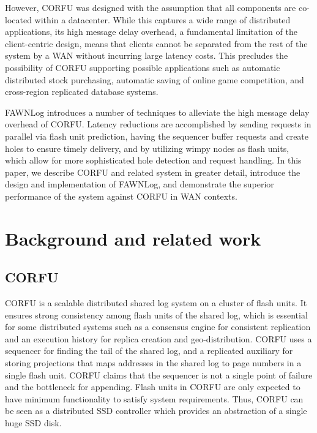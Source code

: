 \documentclass[letterpaper,twocolumn,10pt]{article}
\begin{document}
However, CORFU was designed with the assumption that all components are co-located within a datacenter. While this captures a wide range of distributed applications, its high message delay overhead, a fundamental limitation of the client-centric design, means that clients cannot be separated from the rest of the system by a WAN without incurring large latency costs. This precludes the possibility of CORFU supporting possible applications such as automatic distributed stock purchasing, automatic saving of online game competition, and cross-region replicated database systems.

FAWNLog introduces a number of techniques to alleviate the high message delay overhead of CORFU. Latency reductions are accomplished by sending requests in parallel via flash unit prediction, having the sequencer buffer requests and create holes to ensure timely delivery, and by utilizing wimpy nodes as flash units, which allow for more sophisticated hole detection and request handling. In this paper, we describe CORFU and related system in greater detail, introduce the design and implementation of FAWNLog, and demonstrate the superior performance of the system against CORFU in WAN contexts.

\section{Background and related work}
\subsection{CORFU}
CORFU\cite{corfu} is a scalable distributed shared log system on a cluster of flash units. It ensures strong consistency among flash units of the shared log, which is essential for some distributed systems such as a consensus engine for consistent replication\cite{corfu} and an execution history for replica creation and geo-distribution\cite{seneca}. CORFU uses a sequencer for finding the tail of the shared log, and a replicated auxiliary for storing projections that maps addresses in the shared log to page numbers in a single flash unit. CORFU claims that the sequencer is not a single point of failure and the bottleneck for appending. Flash units in CORFU are only expected to have minimum functionality to satisfy system requirements. Thus, CORFU can be seen as a distributed SSD controller which provides an abstraction of a single huge SSD disk.
\end{document}
